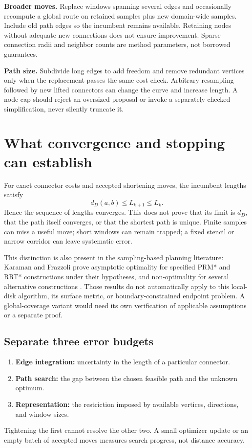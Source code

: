 \documentclass[11pt,letterpaper]{article}
\begin{document}
\textbf{Broader moves.} Replace windows spanning several edges and occasionally recompute a global route on retained samples plus new domain-wide samples. Include old path edges so the incumbent remains available. Retaining nodes without adequate new connections does not ensure improvement. Sparse connection radii and neighbor counts are method parameters, not borrowed guarantees.

\textbf{Path size.} Subdivide long edges to add freedom and remove redundant vertices only when the replacement passes the same cost check. Arbitrary resampling followed by new lifted connectors can change the curve and increase length. A node cap should reject an oversized proposal or invoke a separately checked simplification, never silently truncate it.

\clearpage
\section{What convergence and stopping can establish}\label{sec:stopping}
For exact connector costs and accepted shortening moves, the incumbent lengths satisfy
\begin{equation}\label{eq:monotone}
 d_D(a,b)\le L_{k+1}\le L_k.
\end{equation}
Hence the sequence of lengths converges. This does not prove that its limit is $d_D$, that the path itself converges, or that the shortest path is unique. Finite samples can miss a useful move; short windows can remain trapped; a fixed stencil or narrow corridor can leave systematic error.

This distinction is also present in the sampling-based planning literature: Karaman and Frazzoli prove asymptotic optimality for specified PRM* and RRT* constructions under their hypotheses, and non-optimality for several alternative constructions \cite{karaman2011}. Those results do not automatically apply to this local-disk algorithm, its surface metric, or boundary-constrained endpoint problem. A global-coverage variant would need its own verification of applicable assumptions or a separate proof.

\subsection{Separate three error budgets}
\begin{enumerate}
\item \textbf{Edge integration:} uncertainty in the length of a particular connector.
\item \textbf{Path search:} the gap between the chosen feasible path and the unknown optimum.
\item \textbf{Representation:} the restriction imposed by available vertices, directions, and window sizes.
\end{enumerate}
Tightening the first cannot resolve the other two. A small optimizer update or an empty batch of accepted moves measures search progress, not distance accuracy.
\end{document}

